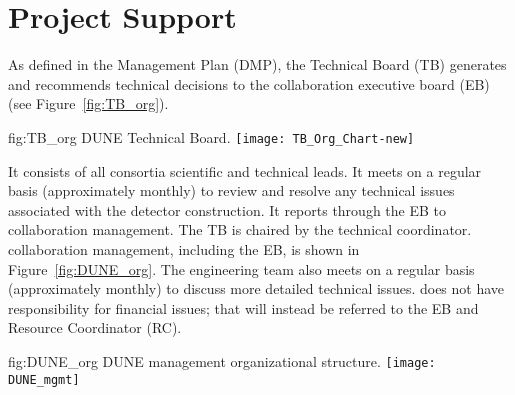 \section{Project Support}
\label{sec:fdsp-coord-supp}

As defined in the  Management Plan (DMP), the 
Technical Board (TB) generates and recommends technical decisions to the 
collaboration executive board (EB) (see Figure~\ref{fig:TB_org}).
\begin{dunefigure}{fig:TB_org}
  {DUNE Technical Board.}
 \texttt{[image: TB\_Org\_Chart-new]}
\end{dunefigure}

It consists of all consortia scientific and technical leads. It meets
on a regular basis (approximately monthly) to review and resolve any
technical issues associated with the detector construction. It reports
through the EB to collaboration management. The  TB
is chaired by the technical coordinator.  collaboration
management, including the EB, is shown in Figure~\ref{fig:DUNE_org}. The
 engineering team also meets on a regular basis (approximately monthly)
to discuss more detailed technical issues.  does not have
responsibility for financial issues; that will instead be referred to
the EB and Resource Coordinator (RC).

\begin{dunefigure}{fig:DUNE_org}
  {DUNE management organizational structure.}
 \texttt{[image: DUNE\_mgmt]}
\end{dunefigure}

